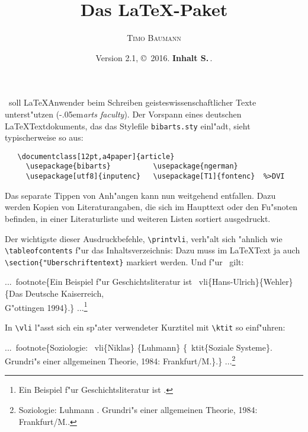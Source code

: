 \documentclass[12pt,a4paper]{article}
\title{Das \LaTeX-Paket \BibArts}
\author{\textsc{Timo Baumann}}
\date{\small Version 2.1, \copyright~2016.  
         \hspace{.5em}{Zur 1.3\hspace{.075em}\hy Kompatibilit"at S.\,\pageref{compabil}.}
         \hspace{.5em}\textbf{Inhalt S.\,\pageref{SectIn}}.}
\newcommand{\pbs}{\string\ \unskip}
\newcommand{\bs}{\protect\pbs}
\begin{document}
 \maketitle 

 \noindent
 \BibArts\ soll \LaTeX\hy Anwender beim Schreiben geisteswissenschaftlicher
 Texte unterst"utzen (\kern-.05em\textit{arts faculty}). Der Vorspann eines deutschen 
 \LaTeX\hy Textdokuments, das das Stylefile \verb|bibarts.sty| einl"adt, 
 sieht typischerweise so aus:

  \vspace{-1.5ex}
        {\small\begin{verbatim}
   \documentclass[12pt,a4paper]{article} 
     \usepackage{bibarts}          \usepackage{ngerman}
     \usepackage[utf8]{inputenc}   \usepackage[T1]{fontenc}  %>DVI
  \end{verbatim}}
 
 \vspace{-4ex}\noindent
 Das separate Tippen von Anh"angen kann nun weitgehend entfallen. 
 Dazu werden Kopien von Literaturangaben, die sich im Haupttext oder 
 den Fu"snoten befinden, in einer Literaturliste und weiteren Listen 
 sortiert ausgedruckt.
 
 \vspace{1ex}\noindent
 Der wichtigste dieser Ausdruckbefehle, \verb|\printvli|, verh"alt sich 
 "ahnlich wie \verb|\tableofcontents| f"ur das Inhaltsverzeichnis: 
 Dazu muss im \LaTeX\hy Text ja auch
 \verb|\section{|\texttt{"Uberschriftentext}\verb|}| markiert werden. 
 Und f"ur \BibArts\ gilt:
 
 \Doppelbox
 {...\bs footnote\{Ein Beispiel f"ur Geschichtsliteratur ist
  \bs vli\{Hans-Ulrich\}\{Wehler\}\{Das Deutsche Kaiserreich, 
  \\ G"ottingen 1994\}.\}
 }
 {...\footnote{Ein Beispiel f"ur Geschichtsliteratur ist
  .}
 }

\noindent
In \verb|\vli| l"asst sich ein sp"ater verwendeter Kurztitel 
mit \verb|\ktit| so einf"uhren:

\Doppelbox
{...\bs footnote\{Soziologie:
 \bs vli\{Niklas\} \{Luhmann\} \{\bs ktit\{Soziale Systeme\}. 
 \\ Grundri"s einer allgemeinen Theorie, 1984: Frankfurt/M.\}.\}
}
{...\footnote{Soziologie:
  {Luhmann} {. Grundri"s einer 
 allgemeinen Theorie, 1984: Frankfurt/M.}.}
}
\end{document}
